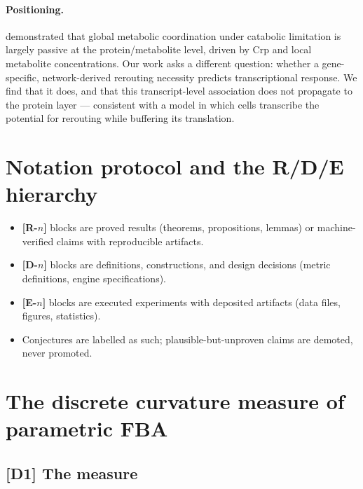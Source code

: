\documentclass[11pt,a4paper]{article}
\theoremstyle{plain}
\theoremstyle{definition}
\theoremstyle{remark}
\begin{document}
\paragraph{Positioning.}
\citet{kochanowski2013} demonstrated that global metabolic coordination under
catabolic limitation is largely passive at the protein/metabolite level,
driven by Crp and local metabolite concentrations. Our work asks a
different question: whether a gene-specific, network-derived rerouting
necessity predicts transcriptional response. We find that it does, and that
this transcript-level association does not propagate to the protein layer
--- consistent with a model in which cells transcribe the potential for
rerouting while buffering its translation.

\section{Notation protocol and the R/D/E hierarchy}\label{sec:notation}

\begin{itemize}
\item \textbf{[R-$n$]} blocks are proved results (theorems, propositions,
      lemmas) or machine-verified claims with reproducible artifacts.
\item \textbf{[D-$n$]} blocks are definitions, constructions, and design
      decisions (metric definitions, engine specifications).
\item \textbf{[E-$n$]} blocks are executed experiments with deposited
      artifacts (data files, figures, statistics).
\item Conjectures are labelled as such; plausible-but-unproven claims are
      demoted, never promoted.
\end{itemize}

\section{The discrete curvature measure of parametric FBA}
\label{sec:measure}


\subsection{[D1] The measure}
\end{document}
